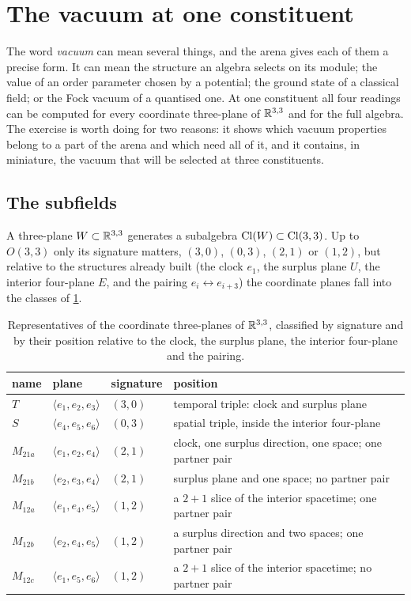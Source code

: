 \section{The vacuum at one constituent}
\label{sec:subfields}

The word \emph{vacuum} can mean several things, and the arena gives each of them a precise form. It can mean the structure an algebra
selects on its module; the value of an order parameter chosen by a potential; the ground state of a classical field; or the Fock
vacuum of a quantised one. At one constituent all four readings can be computed for every coordinate three-plane of $\mathbb{R}^{3,3}$ and for the
full algebra. The exercise is worth doing for two reasons: it shows which vacuum properties belong to a part of the arena and which
need all of it, and it contains, in miniature, the vacuum that will be selected at three constituents.

\subsection{The subfields}

A three-plane $W\subset\mathbb{R}^{3,3}$ generates a subalgebra $\mathrm{Cl}(W)\subset\mathrm{Cl}(3,3)$. Up to $O(3,3)$ only its signature matters, $(3,0)$,
$(0,3)$, $(2,1)$ or $(1,2)$, but relative to the structures already built (the clock $e_1$, the surplus plane $U$, the interior four-plane
$E$, and the pairing $e_i\leftrightarrow e_{i+3}$) the coordinate planes fall into the classes of \cref{tab:subfields}.

\begin{table}[t]
\centering
\small
\begin{tabular}{@{}llll@{}}
\toprule
name & plane & signature & position\\
\midrule
$T$ & $\langle e_1,e_2,e_3\rangle$ & $(3,0)$ & temporal triple: clock and surplus plane\\
$S$ & $\langle e_4,e_5,e_6\rangle$ & $(0,3)$ & spatial triple, inside the interior four-plane\\
$M_{21a}$ & $\langle e_1,e_2,e_4\rangle$ & $(2,1)$ & clock, one surplus direction, one space; one partner pair\\
$M_{21b}$ & $\langle e_2,e_3,e_4\rangle$ & $(2,1)$ & surplus plane and one space; no partner pair\\
$M_{12a}$ & $\langle e_1,e_4,e_5\rangle$ & $(1,2)$ & a $2{+}1$ slice of the interior spacetime; one partner pair\\
$M_{12b}$ & $\langle e_2,e_4,e_5\rangle$ & $(1,2)$ & a surplus direction and two spaces; one partner pair\\
$M_{12c}$ & $\langle e_1,e_5,e_6\rangle$ & $(1,2)$ & a $2{+}1$ slice of the interior spacetime; no partner pair\\
\bottomrule
\end{tabular}
\caption{Representatives of the coordinate three-planes of $\mathbb{R}^{3,3}$, classified by signature and by their position relative to the
clock, the surplus plane, the interior four-plane and the pairing.}
\label{tab:subfields}
\end{table}

